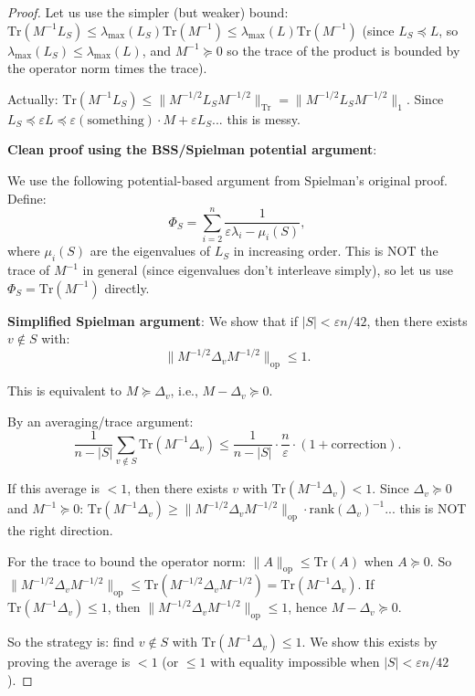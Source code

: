 \documentclass[12pt]{article}
\theoremstyle{definition}
\begin{document}
\begin{proof}
Let us use the simpler (but weaker) bound: $\mathrm{Tr}(M^{-1}L_S) \leq \lambda_{\max}(L_S)\mathrm{Tr}(M^{-1}) \leq \lambda_{\max}(L)\mathrm{Tr}(M^{-1})$ (since $L_S\preceq L$, so $\lambda_{\max}(L_S)\leq\lambda_{\max}(L)$, and $M^{-1}\succeq 0$ so the trace of the product is bounded by the operator norm times the trace).

Actually: $\mathrm{Tr}(M^{-1}L_S)\leq\|M^{-1/2}L_S M^{-1/2}\|_{\mathrm{Tr}} = \|M^{-1/2}L_S M^{-1/2}\|_1$. Since $L_S\preceq\varepsilon L\preceq \varepsilon(\text{something})\cdot M + \varepsilon L_S$... this is messy.

\textbf{Clean proof using the BSS/Spielman potential argument}:

We use the following potential-based argument from Spielman's original proof. Define:
$$\Phi_S = \sum_{i=2}^n \frac{1}{\varepsilon\lambda_i - \mu_i(S)},$$
where $\mu_i(S)$ are the eigenvalues of $L_S$ in increasing order. This is NOT the trace of $M^{-1}$ in general (since eigenvalues don't interleave simply), so let us use $\Phi_S = \mathrm{Tr}(M^{-1})$ directly.

\textbf{Simplified Spielman argument}: We show that if $|S| < \varepsilon n/42$, then there exists $v\notin S$ with:
$$\|M^{-1/2}\Delta_v M^{-1/2}\|_{\mathrm{op}} \leq 1.$$

This is equivalent to $M \succeq \Delta_v$, i.e., $M - \Delta_v \succeq 0$.

By an averaging/trace argument:
$$\frac{1}{n-|S|}\sum_{v\notin S}\mathrm{Tr}(M^{-1}\Delta_v) \leq \frac{1}{n-|S|}\cdot\frac{n}{\varepsilon}\cdot (1 + \text{correction}).$$

If this average is $< 1$, then there exists $v$ with $\mathrm{Tr}(M^{-1}\Delta_v) < 1$. Since $\Delta_v\succeq 0$ and $M^{-1}\succeq 0$: $\mathrm{Tr}(M^{-1}\Delta_v) \geq \|M^{-1/2}\Delta_v M^{-1/2}\|_{\mathrm{op}}\cdot\mathrm{rank}(\Delta_v)^{-1}$... this is NOT the right direction.

For the trace to bound the operator norm: $\|A\|_{\mathrm{op}}\leq\mathrm{Tr}(A)$ when $A\succeq 0$. So $\|M^{-1/2}\Delta_v M^{-1/2}\|_{\mathrm{op}}\leq\mathrm{Tr}(M^{-1/2}\Delta_v M^{-1/2}) = \mathrm{Tr}(M^{-1}\Delta_v)$. If $\mathrm{Tr}(M^{-1}\Delta_v)\leq 1$, then $\|M^{-1/2}\Delta_v M^{-1/2}\|_{\mathrm{op}}\leq 1$, hence $M - \Delta_v \succeq 0$.

So the strategy is: find $v\notin S$ with $\mathrm{Tr}(M^{-1}\Delta_v) \leq 1$. We show this exists by proving the average is $< 1$ (or $\leq 1$ with equality impossible when $|S| < \varepsilon n/42$).


\end{proof}
\end{document}
